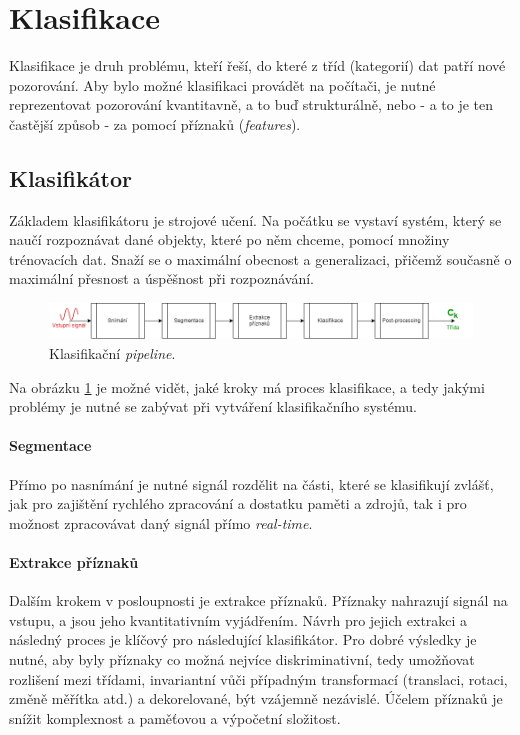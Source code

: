 \documentclass[10pt,a4paper,titlepage]{article}
\begin{document}
  \section{Klasifikace}
  Klasifikace je druh problému, kteří řeší, do které z tříd (kategorií) dat patří nové pozorování.
  Aby bylo možné klasifikaci provádět na počítači, je nutné reprezentovat pozorování kvantitavně,
  a to buď strukturálně, nebo - a to je ten častější způsob - za pomocí příznaků ({\it features}).

  \subsection{Klasifikátor}
  Základem klasifikátoru je strojové učení. Na počátku se vystaví systém, který se naučí rozpoznávat
  dané objekty, které po něm chceme, pomocí množiny trénovacích dat. Snaží se o maximální obecnost
  a generalizaci, přičemž současně o maximální přesnost a úspěšnost při rozpoznávání.

  \begin{figure}[h!]
    \begin{center}
      \includegraphics[width=1\textwidth]{classification.png}
      \caption[title=Obrazek]{Klasifikační {\it pipeline}.\label{fig:classification}}
    \end{center}    
  \end{figure}

  Na obrázku \ref{fig:classification} je možné vidět, jaké kroky má proces klasifikace, a tedy
  jakými problémy je nutné se zabývat při vytváření klasifikačního systému.
  
  \paragraph{Segmentace}
  Přímo po nasnímání je nutné signál rozdělit na části, které se klasifikují zvlášť, jak pro
  zajištění rychlého zpracování a dostatku paměti a zdrojů, tak i pro možnost zpracovávat
  daný signál přímo {\it real-time}.

  \paragraph{Extrakce příznaků}
  Dalším krokem v posloupnosti je extrakce příznaků. Příznaky nahrazují signál na vstupu,
  a jsou jeho kvantitativním vyjádřením. Návrh pro jejich extrakci a následný proces je klíčový
  pro následující klasifikátor. Pro dobré výsledky je nutné, aby byly příznaky co možná nejvíce
  diskriminativní, tedy umožňovat rozlišení mezi třídami, invariantní vůči případným transformací
  (translaci, rotaci, změně měřítka atd.) a dekorelované, být vzájemně nezávislé. Účelem příznaků
  je snížit komplexnost a paměťovou a výpočetní složitost.
\end{document}
